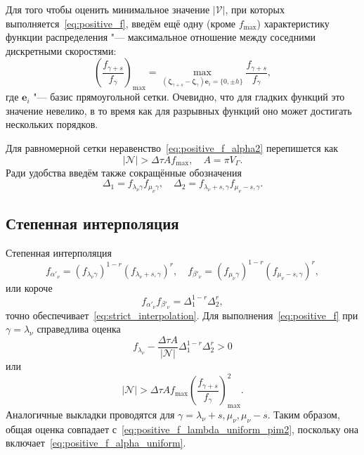 \documentclass[a4paper,12pt]{article}
\newcommand{\bzeta}{\boldsymbol{\zeta}}
\newcommand{\Nu}{\mathcal{N}}
\begin{document}
Для того чтобы оценить минимальное значение \(|\mathcal{V}|\), при которых выполняется~\eqref{eq:positive_f},
введём ещё одну (кроме \(f_{\max}\)) характеристику функции распределения "---
максимальное отношение между соседними дискретными скоростями:
\begin{equation}\label{eq:max_f_ratio_uniform}
    \left(\frac{f_{\gamma+s}}{f_\gamma}\right)_{\max} =
       \max_{(\bzeta_{\gamma+s}-\bzeta_{\gamma})\boldsymbol{e}_i = \{0,\pm{h}\}} \frac{f_{\gamma+s}}{f_\gamma},
\end{equation}
где \(\boldsymbol{e}_i\) "--- базис прямоугольной сетки.
Очевидно, что для гладких функций это значение невелико,
в то время как для разрывных функций оно может достигать нескольких порядков.

Для равномерной сетки неравенство~\eqref{eq:positive_f_alpha2} перепишется как
\begin{equation}\label{eq:positive_f_alpha_uniform}
   |\Nu| > \Delta\tau A f_{\max}, \quad A = \pi V_\Gamma.
\end{equation}
Ради удобства введём также сокращённые обозначения
\begin{equation}\label{eq:uniform_deltas}
    \Delta_1 = f_{\lambda_\nu\gamma}f_{\mu_\nu\gamma}, \quad
    \Delta_2 = f_{\lambda_\nu+s,\gamma}f_{\mu_\nu-s,\gamma}.
\end{equation}

\subsection{Степенная интерполяция}

Степенная интерполяция
\begin{equation}\label{eq:uniform_pim}
    f_{\alpha'_\nu} = \left(f_{\lambda_\nu\gamma}\right)^{1-r} \left(f_{\lambda_\nu+s,\gamma}\right)^r, \quad
    f_{\beta'_\nu} = \left(f_{\mu_\nu\gamma}\right)^{1-r} \left(f_{\mu_\nu-s,\gamma}\right)^r,
\end{equation}
или короче
\begin{equation}\label{eq:uniform_pim2}
    f_{\alpha'_\nu}f_{\beta'_\nu} = \Delta_1^{1-r} \Delta_2^r,
\end{equation}
точно обеспечивает~\eqref{eq:strict_interpolation}.
Для выполнения~\eqref{eq:positive_f} при \(\gamma = \lambda_\nu\) справедлива оценка
\begin{equation}\label{eq:positive_f_lambda_uniform_pim}
   f_{\lambda_\nu} - \frac{\Delta\tau A}{|\Nu|} \Delta_1^{1-r} \Delta_2^r > 0
\end{equation}
или
\begin{equation}\label{eq:positive_f_lambda_uniform_pim2}
   |\Nu| > \Delta\tau A f_{\max} \left(\frac{f_{\gamma+s}}{f_\gamma}\right)_{\max}^2.
\end{equation}
Аналогичные выкладки проводятся для \(\gamma = \lambda_\nu+s, \mu_\nu, \mu_\nu-s\).
Таким образом, общая оценка совпадает с~\eqref{eq:positive_f_lambda_uniform_pim2},
поскольку она включает~\eqref{eq:positive_f_alpha_uniform}.
\end{document}
